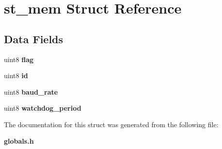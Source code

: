 \section{st\+\_\+mem Struct Reference}
\label{structst__mem}
\subsection*{Data Fields}
\begin{DoxyCompactItemize}
\item 
\mbox{\label{structst__mem_af11e40d15a1361229a78e772af5b3c94}} 
uint8 {\bfseries flag}
\item 
\mbox{\label{structst__mem_a492bfda30c3852a68b2cbfba9531e3d1}} 
uint8 {\bfseries id}
\item 
\mbox{\label{structst__mem_a1a2b3002580421effeca67955a862580}} 
uint8 {\bfseries baud\+\_\+rate}
\item 
\mbox{\label{structst__mem_a1aae70aad54a04c7b41a8d2dcd7aba14}} 
uint8 {\bfseries watchdog\+\_\+period}
\end{DoxyCompactItemize}


The documentation for this struct was generated from the following file\+:\begin{DoxyCompactItemize}
\item 
\textbf{ globals.\+h}\end{DoxyCompactItemize}
